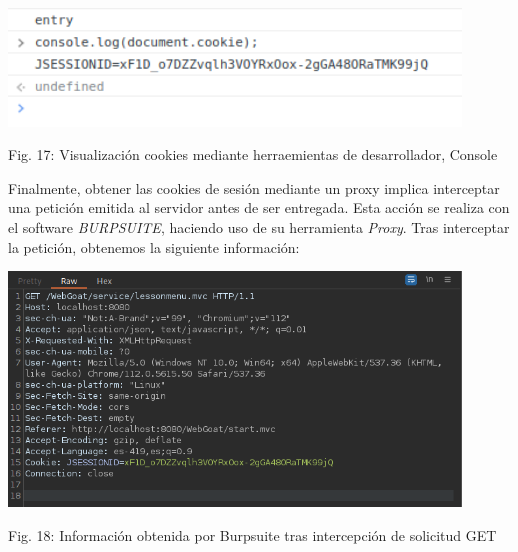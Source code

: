 \documentclass[12pt,oneside,a4paper]{book}
\begin{document}
\begin{enumerate}
\begin{enumerate}
        \begin{center}
            \includegraphics[width=12cm]{img/xss3.png}
            
            \vspace{0.1em}
            
            Fig. 17: Visualización cookies mediante herraemientas de desarrollador, Console
        \end{center}
        
        \vspace{2em}

        \hspace{20pt}
        Finalmente, obtener las cookies de sesión mediante un proxy implica interceptar una petición emitida al servidor antes de ser entregada. Esta acción se realiza con el software \textit{BURPSUITE}, haciendo uso de su herramienta \textit{Proxy}. Tras interceptar la petición, obtenemos la siguiente información:

        \vspace{2em}

        \begin{center}
            \includegraphics[width=12cm]{img/xss4.png}
            
            \vspace{0.1em}
            
            Fig. 18: Información obtenida por Burpsuite tras intercepción de solicitud GET
        \end{center}
        
        \newpage


\end{enumerate}
\end{enumerate}
\end{document}
